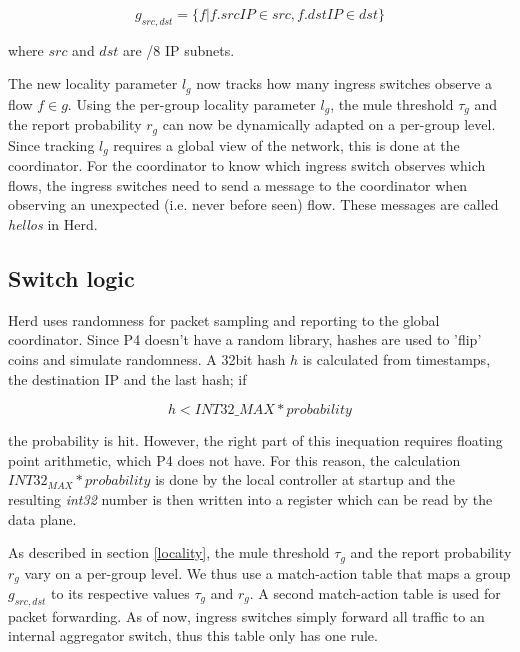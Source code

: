 \documentclass[11pt,oneside,a4paper]{article}
\begin{document}
$$g_{src,dst} = \{f | f.srcIP \in src, f.dstIP \in dst\}$$

\noindent where $src$ and $dst$ are /8 IP subnets.

\noindent The new locality parameter $l_g$ now tracks how many ingress switches observe a flow $f \in g$. Using the per-group locality parameter $l_g$, the mule threshold $\tau_g$ and the report probability $r_g$ can now be dynamically adapted on a per-group level. Since tracking $l_g$ requires a global view of the network, this is done at the coordinator. For the coordinator to know which ingress switch observes which flows, the ingress switches need to send a message to the coordinator when observing an unexpected (i.e. never before seen) flow. These messages are called \textit{hellos} in Herd.



\subsection{Switch logic} \label{switch}
Herd uses randomness for packet sampling and reporting to the global coordinator. Since P4 doesn't have a random library, hashes are used to 'flip' coins and simulate randomness. A  32bit hash $h$ is calculated from timestamps, the destination IP and the last hash; if 

$$h < INT32\_MAX * probability$$

\noindent the probability is hit. However, the right part of this inequation requires floating point arithmetic, which P4 does not have. For this reason, the calculation $INT32_{MAX} * probability$ is done by the local controller at startup and the resulting \textit{int32} number is then written into a register which can be read by the data plane.

As described in section \ref{locality}, the mule threshold $\tau_g$ and the report probability $r_g$ vary on a per-group level. We thus use a match-action table that maps a group $g_{src,dst}$ to its respective values $\tau_g$ and $r_g$. A second match-action table is used for packet forwarding. As of now, ingress switches simply forward all traffic to an internal aggregator switch, thus this table only has one rule.
\end{document}
